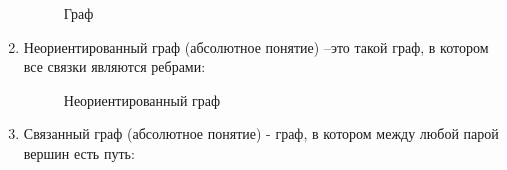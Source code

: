 \documentclass[a4paper]{article}
\begin{document}
\begin{enumerate}
    \begin{figure}[!h]
      \caption{Граф}
    \end{figure}
  \item Неориентированный граф (абсолютное понятие) –это такой граф, в котором все связки являются ребрами:
    \begin{figure}[!h]
      \caption{Неориентированный граф}
    \end{figure}
  \item Связанный граф (абсолютное понятие) - граф, в котором между любой парой вершин есть путь:
    \begin{figure}[!h]

\end{figure}
\end{enumerate}
\end{document}
